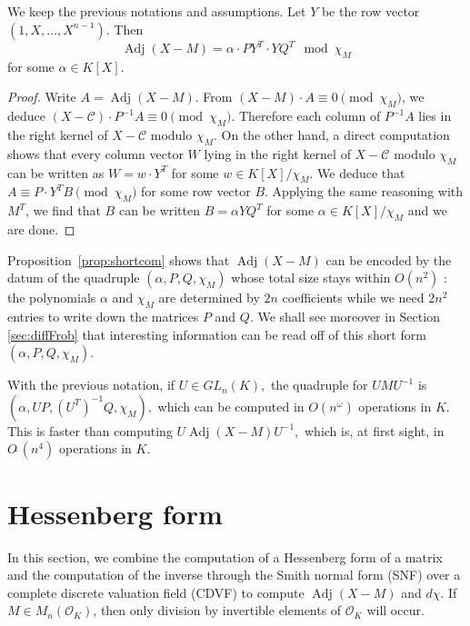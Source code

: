 \documentclass{sig-alternate-05-2015}
\DeclareMathOperator{\adj}{Adj}
\newcommand{\OK}{\mathcal{O}_K}
\newcommand{\softO}{O\tilde{~}}
\newcommand{\tristan}[1]{\textcolor{answer}{{\bf Tristan:} #1}}
\begin{document}
\begin{prop}
\label{prop:shortcom}
We keep the previous notations and assumptions.
Let $Y$ be the row vector $(1, X, \ldots, X^{n-1})$. Then
\begin{equation}
\label{eq:shortcom}
\adj(X{-}M) = \alpha \cdot P Y^T \cdot Y Q^T
\mod \chi_M
\end{equation}
for some $\alpha \in K[X]$.
\end{prop}

\begin{proof}
Write $A = \adj(X{-}M)$. From $(X{-}M) \cdot A \equiv 0 
\pmod{\chi_M}$, we deduce $(X{-}\mathscr{C}) \cdot P^{-1} A \equiv 0 \pmod{\chi_M}$. 
Therefore each column of $P^{-1} A$ lies in the right kernel of $X{-}\mathscr{C}$
modulo $\chi_M$. On the other hand, a direct computation shows that
every column vector $W$ lying in the right kernel of $X{-}\mathscr{C}$ modulo 
$\chi_M$ can be written as $W = w \cdot Y^T$ for some $w \in 
K[X]/\chi_M$. We deduce that $A \equiv P \cdot Y^T B \pmod{\chi_M}$
for some row vector $B$.
Applying the same reasoning with $M^T$, we find that $B$ can be
written $B = \alpha Y Q^T$ for some $\alpha \in K[X]/\chi_M$ and
we are done.
\end{proof}

Proposition~\ref{prop:shortcom} shows that $\adj(X{-}M)$ can be encoded 
by the datum of the quadruple $(\alpha, P, Q, \chi_M)$ whose total size 
stays within $O(n^2)$ : the polynomials $\alpha$ and $\chi_M$ are 
determined by $2n$ coefficients while we need $2n^2$ entries to 
write down the matrices $P$ and $Q$. 
We shall see moreover in Section \ref{sec:diffFrob} that interesting
information can be read off of this short form $(\alpha, P, Q, 
\chi_M)$.

\begin{rem}
With the previous notation, if $U \in GL_n(K),$
the quadruple for 
$UMU^{-1}$ is
$(\alpha, UP, (U^T)^{-1}Q, \chi_M),$
which can be computed in $O(n^\omega)$ operations in $K.$
This is faster than computing $U \adj(X-M) U^{-1},$
which is, at first sight, in $\softO(n^4)$
operations in $K.$
\end{rem}

\section{Hessenberg form}
\label{sec:diffHess}

In this section, we combine the computation of a Hessenberg form of a 
matrix and the computation of the inverse through the Smith normal form 
(SNF) over a complete discrete valuation field (CDVF) to compute 
$\adj(X{-}M)$ and $d \chi$. If $M \in M_n(\OK)$, then only division 
by invertible elements of $\OK$ will occur.
\end{document}
